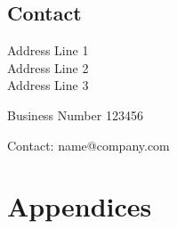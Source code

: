 \documentclass[
	a4paper, %
]{CSMakotoTechnicalReport}
\begin{document}
	\subsection*{Contact}
	
	Address Line 1\\
	Address Line 2\\
	Address Line 3
	
	Business Number 123456
	
	Contact: name@company.com
\endgroup


\newpage

\section*{Appendices}
\end{document}
